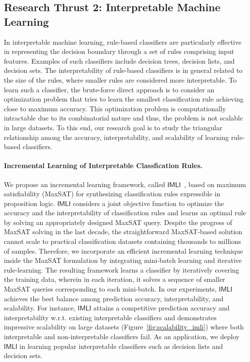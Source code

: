 \documentclass{article}
\begin{document}
	
	\subsection*{Research Thrust 2: Interpretable Machine Learning}

	In interpretable machine learning, rule-based classifiers are particularly effective in representing the decision boundary through a set of rules comprising input features. Examples of such classifiers include decision trees, decision lists, and decision sets. The interpretability of rule-based classifiers is in general related to the size of the rules, where smaller rules are considered more interpretable. To learn such a classifier, the brute-force direct approach is to consider an optimization problem that tries to learn the smallest classification rule achieving close to maximum accuracy. This optimization problem is computationally intractable due to its combinatorial nature and thus, the problem is not scalable in large datasets. To this end, our research goal is to study the triangular relationship among the accuracy, interpretability, and scalability of learning rule-based classifiers.
	
	\paragraph{Incremental Learning of Interpretable Classfication Rules.} We propose an incremental learning framework, called $ \mathsf{IMLI} $~\cite{ghosh22efficient,ghosh2019incremental},  based on maximum satisfiability (MaxSAT) for synthesizing classification rules expressible in proposition logic. $ \mathsf{IMLI} $ considers a joint objective function to optimize the accuracy and the interpretability of classification rules and learns an optimal rule by solving an appropriately designed MaxSAT query. Despite the progress of MaxSAT solving in the last decade, the straightforward MaxSAT-based solution cannot scale to practical classification datasets containing thousands to millions of samples. Therefore, we incorporate an efficient incremental learning technique inside the MaxSAT formulation by integrating mini-batch learning and iterative rule-learning. The resulting framework learns a classifier by iteratively covering the training data, wherein in each iteration, it solves a sequence of smaller MaxSAT queries corresponding to each mini-batch. In our experiments, $ \mathsf{IMLI} $ achieves the best balance among prediction accuracy, interpretability, and scalability. For instance, $ \mathsf{IMLI} $ attains a competitive prediction accuracy and interpretability w.r.t. existing interpretable classifiers and demonstrates impressive scalability on large datasets (Figure~\ref{fig:scalability_imli}) where both interpretable and non-interpretable classifiers fail. As an application, we deploy $ \mathsf{IMLI} $ in learning popular interpretable classifiers such as decision lists and decision sets.
	
\end{document}
